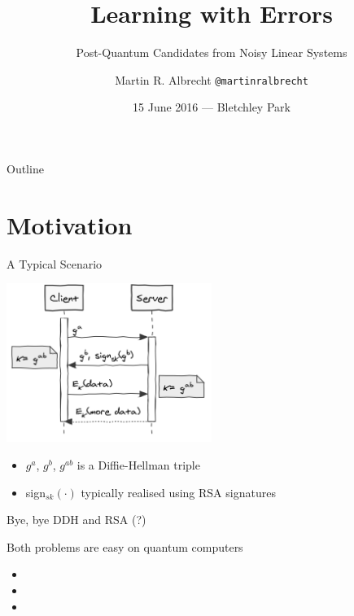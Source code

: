 \documentclass[presentation,smaller]{beamer}
\author{Martin R. Albrecht \texttt{@martinralbrecht}}
\date{15 June 2016 — Bletchley Park}
\title{Learning with Errors}
\subtitle{Post-Quantum Candidates from Noisy Linear Systems}
\begin{document}
\maketitle
\begin{frame}{Outline}
\tableofcontents
\end{frame}


\section{Motivation}
\label{sec:orgheadline5}

\begin{frame}[label={sec:orgheadline1}]{A Typical Scenario}
\begin{center}
\includegraphics[width=0.5\textwidth]{keyex.png}
\end{center}

\begin{itemize}
\item \(g^a\), \(g^b\), \(g^{ab}\) is a \alert{Diffie-Hellman} triple
\item sign\(_{sk}(⋅)\) typically realised using \alert{RSA} signatures
\end{itemize}
\end{frame}

\begin{frame}[label={sec:orgheadline2}]{Bye, bye DDH and RSA (?)}
\begin{center}
Both problems are easy on quantum computers
\end{center}

\pause

\begin{itemize}[<+->]
\item {}
\item {}
\item {}
\end{itemize}
\end{frame}
\end{document}
